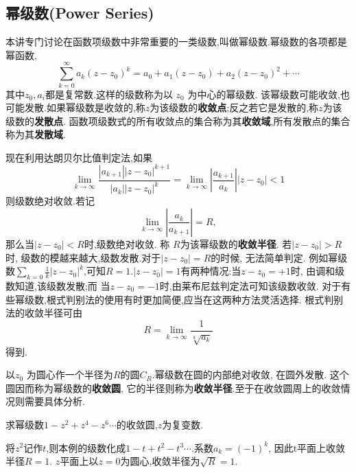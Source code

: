 \subsection{幂级数(Power Series)}
本讲专门讨论在函数项级数中非常重要的一类级数,叫做幂级数.幂级数的各项都是幂函数,
\begin{equation}
    \sum_{k=0}^{\infty} a_k\left(z-z_0\right)^k=a_0+a_1\left(z-z_0\right)+a_2\left(z-z_0\right)^2+\cdots
\end{equation}
其中$z_0, a_i$都是复常数.这样的级数称为以 $z_0$ 为中心的幂级数.
该幂级数可能收敛,也可能发散.如果幂级数是收敛的,称$z$为该级数的\textbf{收敛点};反之若它是发散的,称$z$为该级数的\textbf{发散点}.
函数项级数式的所有收敛点的集合称为其\textbf{收敛域},所有发散点的集合称为其\textbf{发散域}.

现在利用达朗贝尔比值判定法,如果
\begin{equation}
    \lim _{k \rightarrow \infty} \frac{\left|a_{k+1}\right|\left|z-z_0\right|^{k+1}}{\left|a_k\right|\left|z-z_0\right|^k}
    =\lim _{k \rightarrow \infty}\left|\frac{a_{k+1}}{a_k}\right|\left|z-z_0\right|<1
\end{equation}
则级数绝对收敛.若记
\begin{equation}
    \lim_{k \rightarrow \infty} \left|\frac{a_{k}}{a_{k+1}}\right| = R,
\end{equation}
那么当$|z-z_0| < R$时,级数绝对收敛. 称 $R$为该幂级数的\textbf{收敛半径}.
若$|z-z_0| > R$时, 
级数的模越来越大,级数发散.对于$|z-z_0| = R$的时候,
无法简单判定.
例如幂级数$\sum_{k=0} \frac{1}{k} |z-z_0|^k$,可知$R=1$.$|z-z_0|=1$有两种情况:当$z-z_0 = +1$时, 由调和级数知道,该级数发散;而
当$z-z_0 = -1$时,由莱布尼兹判定法可知该级数收敛.
对于有些幂级数,根式判别法的使用有时更加简便,应当在这两种方法灵活选择.
根式判别法的收敛半径可由
\begin{equation}
    R = \lim_{k \rightarrow \infty} \frac{1}{\sqrt[k]{a_k}}
\end{equation}
得到.

以$z_0$ 为圆心作一个半径为$R$的圆$C_R$.幂级数在圆的内部绝对收敛, 在圆外发散. 这个圆因而称为幂级数的\textbf{收敛圆}, 
它的半径则称为\textbf{收敛半径}.至于在收敛圆周上的收敛情况则需要具体分析.

\begin{example}
求幂级数$1 - z^2 + z^4 - z^6\cdots$的收敛圆,$z$为复变数.
\end{example}
\begin{solution}
    将$z^2$记作$t$,则本例的级数化成$1-t + t^2 - t^3\cdots$.系数$a_k =(-1)^k$, 因此t平面上收敛半径$R=1$. 
    $z$平面上以$z=0$为圆心,收敛半径为$\sqrt{R}=1$.
\end{solution}

